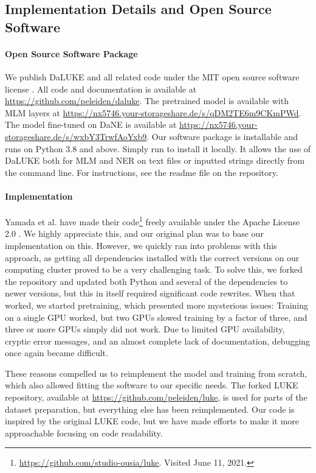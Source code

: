 \documentclass[main.tex]{subfiles}
\begin{document}
\subsection{Implementation Details and Open Source Software}%
\label{sub:oss}

\paragraph{Open Source Software Package}
We publish DaLUKE and all related code under the MIT open source software license \cite{mitlicense}.
All code and documentation is available at \url{https://github.com/peleiden/daluke}.
The pretrained model is available with MLM layers at \url{https://nx5746.your-storageshare.de/s/qDM2TE6m9CKmPWd}.
The model fine-tuned on DaNE is available at \url{https://nx5746.your-storageshare.de/s/wxbY3TrwfAoYxb9}.
Our software package is  installable and runs on Python 3.8 and above.
Simply run  to install it locally.
It allows the use of DaLUKE both for MLM and NER on text files or inputted strings directly from the command line.
For instructions, see the readme file on the repository.

\paragraph{Implementation}
Yamada et al. have made their code\footnote{\url{https://github.com/studio-ousia/luke}. Visited June 11, 2021.} freely available under the Apache License 2.0 \cite{apachelicense}.
We highly appreciate this, and our original plan was to base our implementation on this.
However, we quickly ran into problems with this approach, as getting all dependencies installed with the correct versions on our computing cluster proved to be a very challenging task.
To solve this, we forked the repository and updated both Python and several of the dependencies to newer versions, but this in itself required significant code rewrites.
When that worked, we started pretraining, which presented more mysterious issues:
Training on a single GPU worked, but two GPUs slowed training by a factor of three, and three or more GPUs simply did not work.
Due to limited GPU availability, cryptic error messages, and an almost complete lack of documentation, debugging once again became difficult.

These reasons compelled us to reimplement the model and training from scratch,  which also allowed fitting the software to our specific needs.
The forked LUKE repository, available at \url{https://github.com/peleiden/luke}, is used for parts of the dataset preparation, but everything else has been reimplemented.
Our code is inspired by the original LUKE code, but we have made efforts to make it more approachable focusing on code readability.
\end{document}
